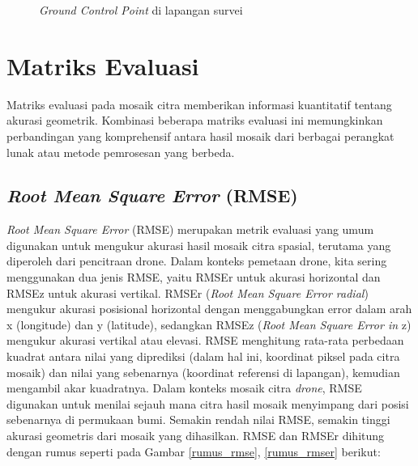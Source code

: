  \begin{figure}[H]
\centering
{}
\caption{\textit{Ground Control Point} di lapangan survei}
\label{dig_facenet}
\end{figure}

\section{Matriks Evaluasi}

\par Matriks evaluasi pada mosaik citra memberikan informasi kuantitatif tentang akurasi geometrik. Kombinasi beberapa matriks evaluasi ini memungkinkan perbandingan yang komprehensif antara hasil mosaik dari berbagai perangkat lunak atau metode pemrosesan yang berbeda.

\subsection{\textit{Root Mean Square Error} (RMSE)}
    \textit{Root Mean Square Error} (RMSE) merupakan metrik evaluasi yang umum digunakan untuk mengukur akurasi hasil mosaik citra spasial, terutama yang diperoleh dari pencitraan drone. Dalam konteks pemetaan drone, kita sering menggunakan dua jenis RMSE, yaitu RMSEr untuk akurasi horizontal dan RMSEz untuk akurasi vertikal. RMSEr (\textit{Root Mean Square Error radial}) mengukur akurasi posisional horizontal dengan menggabungkan error dalam arah x (longitude) dan y (latitude), sedangkan RMSEz (\textit{Root Mean Square Error in} z) mengukur akurasi vertikal atau elevasi. RMSE menghitung rata-rata perbedaan kuadrat antara nilai yang diprediksi (dalam hal ini, koordinat piksel pada citra mosaik) dan nilai yang sebenarnya (koordinat referensi di lapangan), kemudian mengambil akar kuadratnya. Dalam konteks mosaik citra \textit{drone}, RMSE digunakan untuk menilai sejauh mana citra hasil mosaik menyimpang dari posisi sebenarnya di permukaan bumi. Semakin rendah nilai RMSE, semakin tinggi akurasi geometris dari mosaik yang dihasilkan. RMSE dan RMSEr dihitung dengan rumus seperti pada Gambar \ref{rumus_rmse}, \ref{rumus_rmser} berikut:

